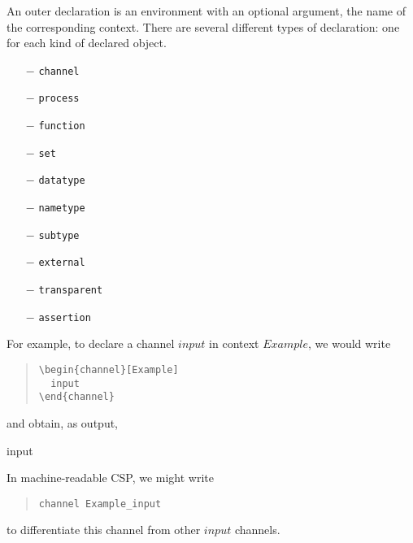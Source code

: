 \documentclass[fleqn,a4paper]{article}
\begin{document}
An outer declaration is an environment with an optional argument, the
name of the corresponding context.  There are several different types
of declaration: one for each kind of declared object.
\begin{itemize} \itemsep 0pt
\item[$-$] \verb=channel=
\item[$-$] \verb=process=
\item[$-$] \verb=function=
\item[$-$] \verb=set=
\item[$-$] \verb=datatype=
\item[$-$] \verb=nametype=
\item[$-$] \verb=subtype=
\item[$-$] \verb=external=
\item[$-$] \verb=transparent=
\item[$-$] \verb=assertion=
\end{itemize}
For example, to declare a channel $input$ in context $Example$, we
would write
\begin{quote}
  \begin{verbatim}
\begin{channel}[Example]
  input
\end{channel}
\end{verbatim}
\end{quote}
and obtain, as output,
\begin{channel}[Example]
  input
\end{channel}
In machine-readable CSP, we might write
\begin{quote}
\begin{verbatim}
channel Example_input
\end{verbatim}
\end{quote}
to differentiate this channel from other $input$ channels. 
\end{document}
